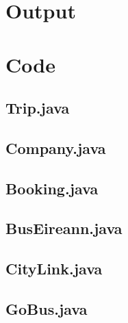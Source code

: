 \documentclass{article}
\begin{document}
	\section{Output}
	\section{Code}
	\subsection{Trip.java}
	\subsection{Company.java}
	\subsection{Booking.java}
	\subsection{BusEireann.java}
	\subsection{CityLink.java}
	\subsection{GoBus.java}
	
	
\end{document}
